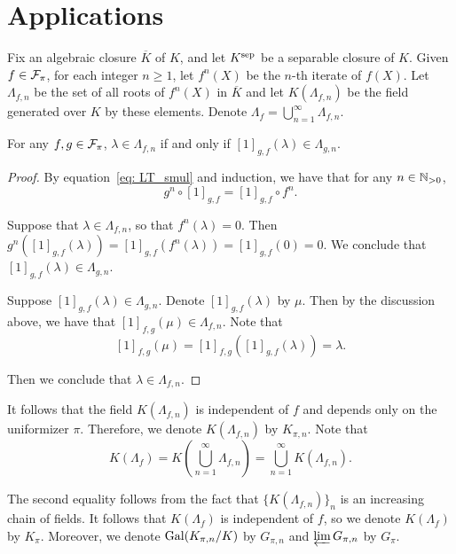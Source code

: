 \section{Applications}
Fix an algebraic closure $\overline{K}$ of $K$, and let $K^{\mathrm{sep}}$ be a separable closure of $K$.
Given $f\in \mathcal{F}_\pi$, for each integer $n \ge 1$, let $f^n(X)$ be the $n$-th iterate of $f(X)$.
Let $\Lambda_{f,n}$ be the set of all roots of $f^n(X)$ in $\overline{K}$ and let
$K(\Lambda_{f,n})$ be the field generated over $K$ by these elements.
Denote $\Lambda_f = \bigcup_{n=1}^\infty \Lambda _{f,n} $.

\begin{lemma}
    For any $f,g\in \mathcal{F}_\pi$, $\lambda \in \Lambda_{f,n}$ if and only
    if $[1]_{g,f} (\lambda) \in \Lambda_{g,n}$.
\end{lemma}

\begin{proof}
    By equation~\eqref{eq: LT_smul} and induction, we have that for
    any $n \in \mathbb{N}_{>0}$,
    \[g^n \circ [1]_{g,f} = [1]_{g,f} \circ f^n. \]

    Suppose that $\lambda \in \Lambda_{f, n}$, so that $f^n(\lambda) = 0$.
    Then $g^n([1]_{g,f}(\lambda)) = [1]_{g,f} (f^n(\lambda)) = [1]_{g,f}(0) = 0$.
    We conclude that $[1]_{g,f} (\lambda) \in \Lambda_{g,n}$.

    Suppose $[1]_{g,f}(\lambda) \in \Lambda_{g, n}$. Denote
    $[1]_{g,f}(\lambda)$ by $\mu$. Then by the discussion above, we have that
    $[1]_{f,g}(\mu) \in \Lambda_{f, n}$. Note that
    \[[1]_{f,g}(\mu) = [1]_{f,g}([1]_{g,f}(\lambda)) = \lambda. \]

    Then we conclude that $\lambda \in \Lambda_{f, n}$.
\end{proof}

\begin{remark}

    It follows that the field $K(\Lambda_{f,n})$ is independent of $f$ and depends only
    on the uniformizer $\pi$. Therefore, we denote $K(\Lambda_{f,n})$ by
    $K_{\pi,n}$. Note that
    \[K(\Lambda_f) = K \left(\bigcup_{n=1}^{\infty} \Lambda_{f, n}\right) =
    \bigcup_{n=1}^{\infty} K (\Lambda_{f,n}).\]

    The second equality follows from the fact that
    $\{ K(\Lambda_{f, n}) \}_n$ is an increasing chain of fields.
    It follows that $K(\Lambda_f)$ is independent of $f$, so we denote $K(\Lambda_f)$ by $K_\pi$.
    Moreover, we denote $\mathrm{Gal}(K_{\pi,n}/K)$ by $G_{\pi, n}$
    and $\varprojlim G_{\pi,n}$ by $G_\pi$.
\end{remark}

